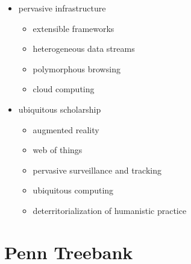 \begin{multicols}{2}
\begin{itemize}
  \item pervasive infrastructure
  \begin{itemize}
    \item extensible frameworks
    \item	heterogeneous data streams
    \item	polymorphous browsing
    \item	cloud computing
  \end{itemize}
  \item ubiquitous scholarship
  \begin{itemize}
    \item augmented reality
    \item	web of things
    \item	pervasive surveillance and tracking
    \item	ubiquitous computing
    \item	deterritorialization of humanistic practice
  \end{itemize}
\end{itemize}
\end{multicols}

\section{Penn Treebank}
\label{s:penntreebank}

